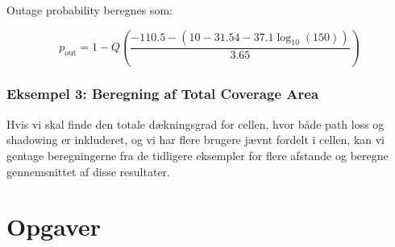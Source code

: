 \documentclass[a4paper,12pt]{book}
\begin{document}
	Outage probability beregnes som:
	
	\[
	p_{\text{out}} = 1 - Q\left(\frac{-110.5 - \left(10 - 31.54 - 37.1 \log_{10}(150)\right)}{3.65}\right)
	\]
	
	\subsubsection{Eksempel 3: Beregning af Total Coverage Area}
	
	Hvis vi skal finde den totale dækningsgrad for cellen, hvor både path loss og shadowing er inkluderet, og vi har flere brugere jævnt fordelt i cellen, kan vi gentage beregningerne fra de tidligere eksempler for flere afstande og beregne gennemsnittet af disse resultater.
	
	\section{Opgaver}
	
	
	
	
	
\end{document}
